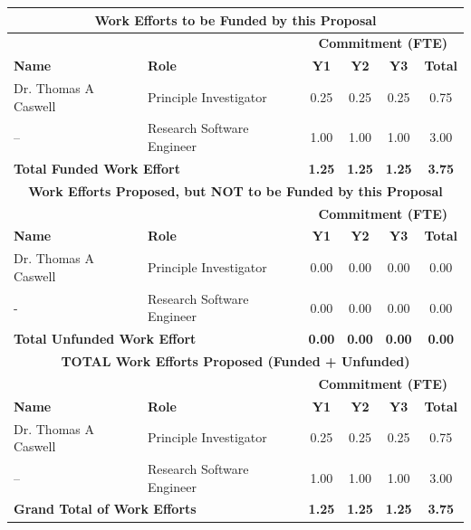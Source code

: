 \documentclass[12pt]{article}
\numberwithin{page}{section}
\begin{document}
\begin{tabular}{|l|l|c|c|c|c|}
  \hline
  \multicolumn{6}{|c|}{\cellcolor{gray!30}\textbf{Work Efforts to be Funded by this Proposal}}\\
  \hline
  \cellcolor{gray!30} &  \cellcolor{gray!30}&\multicolumn{4}{c|}{\cellcolor{gray!30}\textbf{Commitment (FTE)}} \\
  \hhline{|*2{>{\arrayrulecolor{gray!30}}-}*4{>{\arrayrulecolor{black}}-}|}
  \cellcolor{gray!30}\textbf{Name }& \cellcolor{gray!30}\textbf{Role} & \cellcolor{gray!30}\textbf{Y1} & \cellcolor{gray!30}\textbf{Y2} & \cellcolor{gray!30}\textbf{Y3} & \cellcolor{gray!30}\textbf{Total}     \\  \hline
  Dr. Thomas A Caswell & Principle Investigator & 0.25 & 0.25 & 0.25 & 0.75 \\  \hline
  -- & Research Software Engineer & 1.00 & 1.00 & 1.00 & 3.00 \\  \hline
  \multicolumn{2}{|l|}{\textbf{Total Funded Work Effort}} & \textbf{1.25} & \textbf{1.25} & \textbf{1.25}& \textbf{3.75}\\    \hline
  \multicolumn{6}{|c|}{\cellcolor{gray!30}\textbf{Work Efforts Proposed, but NOT to be Funded by this Proposal}}\\  \hline
  \cellcolor{gray!30} &  \cellcolor{gray!30}&\multicolumn{4}{c|}{\cellcolor{gray!30}\textbf{Commitment (FTE)}} \\
  \hhline{|*2{>{\arrayrulecolor{gray!30}}-}*4{>{\arrayrulecolor{black}}-}|}
  \cellcolor{gray!30}\textbf{Name }& \cellcolor{gray!30}\textbf{Role} & \cellcolor{gray!30}\textbf{Y1} & \cellcolor{gray!30}\textbf{Y2} & \cellcolor{gray!30}\textbf{Y3} & \cellcolor{gray!30}\textbf{Total}     \\  \hline
  Dr. Thomas A Caswell & Principle Investigator & 0.00 & 0.00 & 0.00 & 0.00 \\  \hline
  - & Research Software Engineer & 0.00 & 0.00 & 0.00 & 0.00 \\  \hline
  \multicolumn{2}{|l|}{\textbf{Total Unfunded Work Effort}} & \textbf{0.00} & \textbf{0.00} & \textbf{0.00}& \textbf{0.00}\\\hline
  \multicolumn{6}{|c|}{\cellcolor{gray!30}\textbf{TOTAL Work Efforts Proposed (Funded + Unfunded)}}\\  \hline
  \cellcolor{gray!30} &  \cellcolor{gray!30}&\multicolumn{4}{c|}{\cellcolor{gray!30}\textbf{Commitment (FTE)}} \\\hhline{|*2{>{\arrayrulecolor{gray!30}}-}*4{>{\arrayrulecolor{black}}-}|}
  \cellcolor{gray!30}\textbf{Name }& \cellcolor{gray!30}\textbf{Role} & \cellcolor{gray!30}\textbf{Y1} & \cellcolor{gray!30}\textbf{Y2} & \cellcolor{gray!30}\textbf{Y3} & \cellcolor{gray!30}\textbf{Total}     \\      \hline
  Dr. Thomas A Caswell & Principle Investigator & 0.25 & 0.25 & 0.25 & 0.75 \\  \hline
  -- & Research Software Engineer & 1.00 & 1.00 & 1.00 & 3.00 \\  \hline
  \multicolumn{2}{|l|}{\textbf{Grand Total of Work Efforts}} & \textbf{1.25} & \textbf{1.25} & \textbf{1.25}& \textbf{3.75}\\  \hline
\end{tabular}
\end{document}
